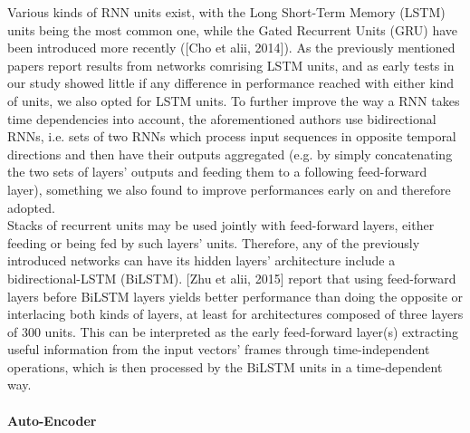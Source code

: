 Various kinds of RNN units exist, with the Long Short-Term Memory (LSTM) units being the most common one, while the Gated Recurrent Units (GRU) have been introduced more recently ([Cho et alii, 2014]). As the previously mentioned papers report results from networks comrising LSTM units, and as early tests in our study showed little if any difference in performance reached with either kind of units, we also opted for LSTM units. To further improve the way a RNN takes time dependencies into account, the aforementioned authors use bidirectional RNNs, i.e. sets of two RNNs which process input sequences in opposite temporal directions and then have their outputs aggregated (e.g. by simply concatenating the two sets of layers' outputs and feeding them to a following feed-forward layer), something we also found to improve performances early on and therefore adopted.\\

Stacks of recurrent units may be used jointly with feed-forward layers, either feeding or being fed by such layers' units. Therefore, any of the previously introduced networks can have its hidden layers' architecture include a bidirectional-LSTM (BiLSTM). [Zhu et alii, 2015] report that using feed-forward layers before BiLSTM layers yields better performance than doing the opposite or interlacing both kinds of layers, at least for architectures composed of three layers of 300 units. This can be interpreted as the early feed-forward layer(s) extracting useful information from the input vectors' frames through time-independent operations, which is then processed by the BiLSTM units in a time-dependent way.\\

\paragraph{Auto-Encoder}

